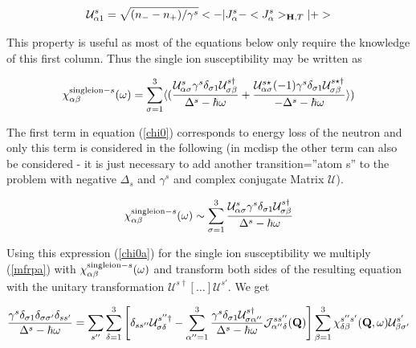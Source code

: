 \begin{equation}\label{ufirstrow}
{\mathcal U^s_{\alpha1}}=\sqrt{(n_--n_+)/\gamma^s}<-|J^s_{\alpha}-<J^s_{\alpha}>_{\mathbf H,T}|+>
\end{equation}

 This property is useful as most of the equations below only require the knowledge of this first column.
 Thus the single ion susceptibility may be written as

\begin{equation}\label{chi0}
\chi^{{\rm single ion-} s}_{\alpha\beta}(\omega)=\sum_{\sigma=1}^3
\langle (
\frac{\mathcal U^{s}_{\alpha\sigma}\gamma^s\delta_{\sigma 1}\mathcal U^{s\dag}_{\sigma\beta}}{\Delta^s-\hbar \omega}+
\frac{\mathcal U^{s\star}_{\alpha\sigma}(-1)\gamma^s\delta_{\sigma 1}\mathcal %
U^{s\star\dag}_{\sigma\beta}}{-\Delta^s-\hbar \omega}
\rangle )
\end{equation}

The first term in equation (\ref{chi0}) corresponds to energy loss of the neutron and only this term is considered in
the following (in {\prg mcdisp} the other term can also be considered - it is just
necessary to add another transition=''atom s'' to the problem with negative $\Delta_s$
and $\gamma^s$ and complex conjugate Matrix $\mathcal U$).

\begin{equation}\label{chi0a}
\chi^{{\rm single ion-} s}_{\alpha\beta}(\omega) \sim \sum_{\sigma=1}^3
\frac{\mathcal U^{s}_{\alpha\sigma}\gamma^s\delta_{\sigma 1}\mathcal U^{s\dag}_{\sigma\beta}}{\Delta^s-\hbar \omega}
\end{equation}

Using this expression (\ref{chi0a}) for the single ion susceptibility we multiply (\ref{mfrpa}) with 
$\chi^{{\rm single ion-} s}_{\alpha\beta}(\omega)$ and transform both sides of the resulting equation
with the unitary transformation ${\mathcal U}^{s\dag}[\dots]\mathcal U^{s'}$. We get

\begin{equation}\label{utransform}
\frac{\gamma^s \delta_{\sigma1} \delta_{\sigma\sigma'} \delta_{ss'}}{\Delta^s-\hbar\omega}
=
\sum_{s''}\sum_{\delta=1}^3
\left[\delta_{ss''}\mathcal U^{s''\dag}_{\sigma\delta}- \sum_{\alpha''=1}^3
\frac{\gamma^s\delta_{\sigma1} \mathcal U^{s\dag}_{\sigma\alpha''}}{\Delta^s-\hbar\omega}\mathcal %
J^{ss''}_{\alpha''\delta}(\mbf Q) \right] 
\sum_{\beta=1}^{3}
\chi_{\delta\beta}^{s''s'}({\mbf Q},\omega) \mathcal U^{s'}_{\beta\sigma'}
\end{equation}


